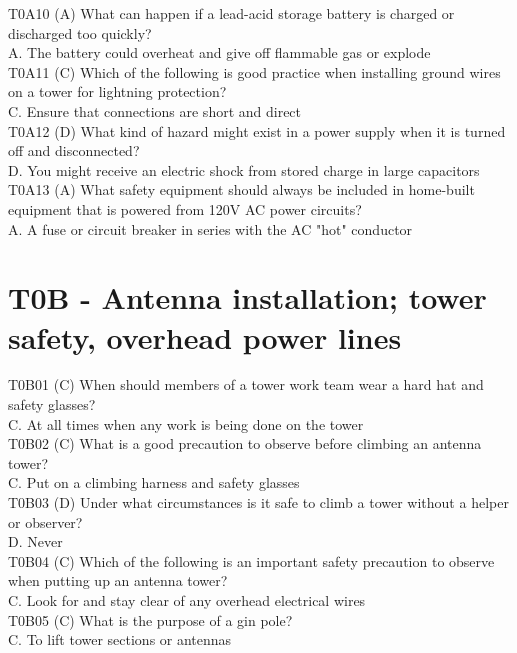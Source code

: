 \documentclass[12pt,letterpaper]{report}
\begin{document}
T0A10 (A) What can happen if a lead-acid storage battery is charged or discharged too quickly?\\
A. The battery could overheat and give off flammable gas or explode\\

T0A11 (C) Which of the following is good practice when installing ground wires on a tower for lightning protection?\\
C. Ensure that connections are short and direct\\


T0A12 (D) What kind of hazard might exist in a power supply when it is turned off and disconnected?\\
D. You might receive an electric shock from stored charge in large capacitors\\

T0A13 (A) What safety equipment should always be included in home-built equipment that is powered from 120V AC power circuits?\\
A. A fuse or circuit breaker in series with the AC "hot" conductor\\

\section{T0B - Antenna installation; tower safety, overhead power lines}

T0B01 (C) When should members of a tower work team wear a hard hat and safety glasses?\\
C. At all times when any work is being done on the tower\\

T0B02 (C) What is a good precaution to observe before climbing an antenna tower?\\
C. Put on a climbing harness and safety glasses\\

T0B03 (D) Under what circumstances is it safe to climb a tower without a helper or observer?\\
D. Never\\

T0B04 (C) Which of the following is an important safety precaution to observe when putting up an antenna tower?\\
C. Look for and stay clear of any overhead electrical wires\\

T0B05 (C) What is the purpose of a gin pole?\\
C. To lift tower sections or antennas\\
\end{document}
